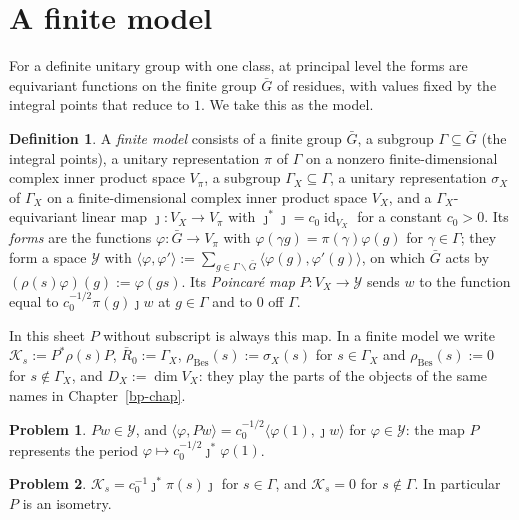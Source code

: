 \documentclass[reqno]{amsart}
\newcounter{chap}
\theoremstyle{definition}
\newtheorem{problem}{Problem}[section]
\newtheorem{definition}{Definition}[section]
\theoremstyle{plain}
\theoremstyle{remark}
\newcommand{\Gb}{\bar G}
\newcommand{\Rb}{\bar R_0}
\newcommand{\Yc}{\mathcal Y}
\newcommand{\Kc}{\mathcal K}
\newcommand{\rB}{\rho_{\mathrm{Bes}}}
\begin{document}
\section{A finite model}\label{sec:model}

For a definite unitary group with one class, at principal level the forms are equivariant functions on the finite group \(\Gb\) of residues, with values fixed by the integral points that reduce to \(1\).  We take this as the model.

\begin{definition}\label{def:model}
A \emph{finite model} consists of a finite group \(\Gb\), a subgroup \(\Gamma\subseteq\Gb\) (the integral points), a unitary representation \(\pi\) of \(\Gamma\) on a nonzero finite-dimensional complex inner product space \(V_\pi\), a subgroup \(\Gamma_X\subseteq\Gamma\), a unitary representation \(\sigma_X\) of \(\Gamma_X\) on a finite-dimensional complex inner product space \(V_X\), and a \(\Gamma_X\)-equivariant linear map \(\jmath\colon V_X\to V_\pi\) with \(\jmath^*\jmath=c_0\operatorname{id}_{V_X}\) for a constant \(c_0>0\).  Its \emph{forms} are the functions \(\varphi\colon\Gb\to V_\pi\) with \(\varphi(\gamma g)=\pi(\gamma)\varphi(g)\) for \(\gamma\in\Gamma\); they form a space \(\Yc\) with \(\langle\varphi,\varphi'\rangle:=\sum_{g\in\Gamma\backslash\Gb}\langle\varphi(g),\varphi'(g)\rangle\), on which \(\Gb\) acts by \((\rho(s)\varphi)(g):=\varphi(gs)\).  Its \emph{Poincar\'e map} \(P\colon V_X\to\Yc\) sends \(w\) to the function equal to \(c_0^{-1/2}\pi(g)\jmath w\) at \(g\in\Gamma\) and to \(0\) off \(\Gamma\).
\end{definition}

In this sheet \(P\) without subscript is always this map.  In a finite model we write \(\Kc_s:=P^*\rho(s)P\), \(\Rb:=\Gamma_X\), \(\rB(s):=\sigma_X(s)\) for \(s\in\Gamma_X\) and \(\rB(s):=0\) for \(s\notin\Gamma_X\), and \(D_X:=\dim V_X\): they play the parts of the objects of the same names in Chapter~\ref{bp-chap}.

\begin{problem}\label{pr:model-period}
\(Pw\in\Yc\), and \(\langle\varphi,Pw\rangle=c_0^{-1/2}\langle\varphi(1),\jmath w\rangle\) for \(\varphi\in\Yc\): the map \(P\) represents the period \(\varphi\mapsto c_0^{-1/2}\jmath^*\varphi(1)\).
\end{problem}

\begin{problem}\label{pr:model-gram}
\(\Kc_s=c_0^{-1}\jmath^*\pi(s)\jmath\) for \(s\in\Gamma\), and \(\Kc_s=0\) for \(s\notin\Gamma\).  In particular \(P\) is an isometry.
\end{problem}
\end{document}
